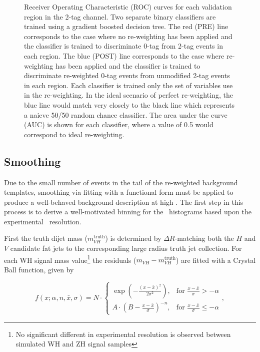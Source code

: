 \begin{figure}[htbp!]
\begin{center}
\end{center}
\caption{ Receiver Operating Characteristic (ROC) curves for each validation region in the 2-tag channel. Two separate binary classifiers are trained using a gradient boosted decision tree.
    The red (PRE) line corresponds to the case where no re-weighting has been applied and the classifier is trained to discriminate 0-tag from 2-tag events in each region.
    The blue (POST) line corresponds to the case where re-weighting has been applied and the classifier is trained to discriminate re-weighted 0-tag events from unmodified 2-tag events in each region.
    Each classifier is trained only the set of variables use in the re-weighting.
    In the ideal scenario of perfect re-weighting, the blue line would match very closely to the black line which represents a naieve 50/50 random chance classifier.
    The area under the curve (AUC) is shown for each classifier, where a value of 0.5 would correspond to ideal re-weighting.}
\label{fig:bdt_roc_curves_2tag}
\end{figure}

\subsection{Smoothing}
\label{sec:bkg_fitting}
Due to the small number of events in the tail of the re-weighted background templates, smoothing via fitting with a functional form must be applied to produce a well-behaved background description at high \mvh.
The first step in this process is to derive a well-motivated binning for the \mvh\ histograms based upon the experimental \mvh\ resolution.

First the truth dijet mass ($m_{VH}^{\mathrm{truth}}$) is determined by $\Delta R$-matching both the $H$ and $V$ candidate fat jets to the corresponding  large radius truth jet collection.
For each WH signal mass value\footnote{No significant different in experimental resolution is observed between simulated WH and ZH signal samples} the residuals ($m_{VH} - m_{VH}^{\mathrm{truth}}$) are fitted with a Crystal Ball function, given by 

\begin{equation}
f(x;\alpha,n,\bar x,\sigma) = N \cdot
    \begin{cases}
        \exp(- \frac{(x - \bar x)^2}{2 \sigma^2}), & \mbox{for }\frac{x - \bar x}{\sigma} > -\alpha \\
        A \cdot (B - \frac{x - \bar x}{\sigma})^{-n}, & \mbox{for }\frac{x - \bar x}{\sigma} \leqslant -\alpha
    \end{cases},
\end{equation}

